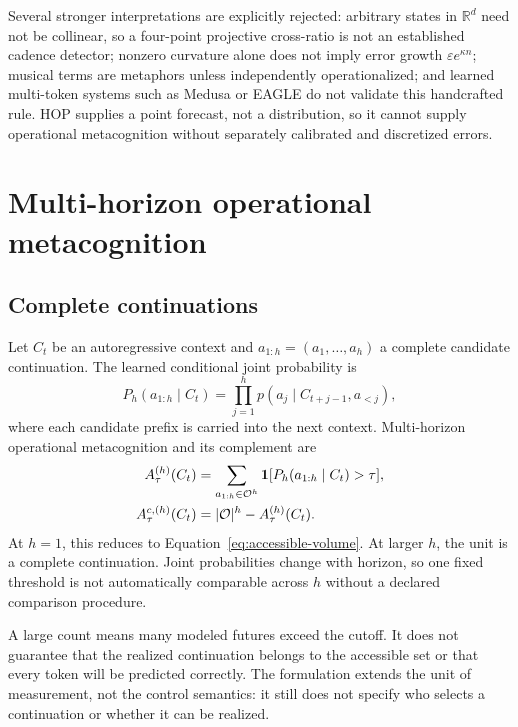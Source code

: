 Several stronger interpretations are explicitly rejected: arbitrary states in $\mathbb R^d$ need not be collinear, so a four-point projective cross-ratio is not an established cadence detector; nonzero curvature alone does not imply error growth $\varepsilon e^{\kappa n}$; musical terms are metaphors unless independently operationalized; and learned multi-token systems such as Medusa or EAGLE do not validate this handcrafted rule. HOP supplies a point forecast, not a distribution, so it cannot supply operational metacognition without separately calibrated and discretized errors.

\section{Multi-horizon operational metacognition}
\subsection{Complete continuations}
Let $C_t$ be an autoregressive context and $a_{1:h}=(a_1,\ldots,a_h)$ a complete candidate continuation. The learned conditional joint probability is
\begin{equation}
P_h(a_{1:h}\mid C_t)=
\prod_{j=1}^{h}p(a_j\mid C_{t+j-1},a_{<j}),
\label{eq:joint-continuation}
\end{equation}
where each candidate prefix is carried into the next context. Multi-horizon operational metacognition and its complement are
\begin{align}
A^{(h)}_\tau(C_t)&=\sum_{a_{1:h}\in\mathcal O^h}
\mathbf 1[P_h(a_{1:h}\mid C_t)>\tau],\label{eq:multi-horizon}\\
A^{c,(h)}_\tau(C_t)&=|\mathcal O|^h-A^{(h)}_\tau(C_t).
\end{align}
At $h=1$, this reduces to Equation~\eqref{eq:accessible-volume}. At larger $h$, the unit is a complete continuation. Joint probabilities change with horizon, so one fixed threshold is not automatically comparable across $h$ without a declared comparison procedure.

A large count means many modeled futures exceed the cutoff. It does not guarantee that the realized continuation belongs to the accessible set or that every token will be predicted correctly. The formulation extends the unit of measurement, not the control semantics: it still does not specify who selects a continuation or whether it can be realized.

